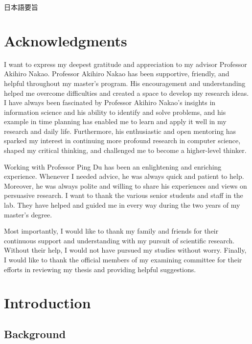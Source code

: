 \documentclass[a4paper,12pt]{report}
\begin{document}
日本語要旨
\newpage

\chapter*{\centering Acknowledgments}

I want to express my deepest gratitude and appreciation to my advisor
Professor Akihiro Nakao. Professor Akihiro Nakao has been supportive,
friendly, and helpful throughout my master's program. His encouragement
and understanding helped me overcome difficulties and created a space to
develop my research ideas. I have always been fascinated by Professor
Akihiro Nakao's insights in information science and his ability to identify
and solve problems, and his example in time planning has enabled me to learn
and apply it well in my research and daily life. Furthermore, his enthusiastic
and open mentoring has sparked my interest in continuing more profound
research in computer science, shaped my critical thinking, and challenged
me to become a higher-level thinker.

Working with Professor Ping Du has been an enlightening and enriching
experience. Whenever I needed advice, he was always quick and patient to
help. Moreover, he was always polite and willing to share his experiences
and views on persuasive research.
I want to thank the various senior students and staff in the lab. They
have helped and guided me in every way during the two years of my master's
degree.

Most importantly, I would like to thank my family and friends for their
continuous support and understanding with my pursuit of scientific research.
Without their help, I would not have pursued my studies without worry.
Finally, I would like to thank the official members of my examining
committee for their efforts in reviewing my thesis and providing helpful
suggestions.

\tableofcontents
\listoffigures
\listoftables

\cleardoublepage

\chapter{Introduction}

\setcounter{page}{1}
\renewcommand{\thepage}{\arabic{page}}

\section{Background}
\end{document}
